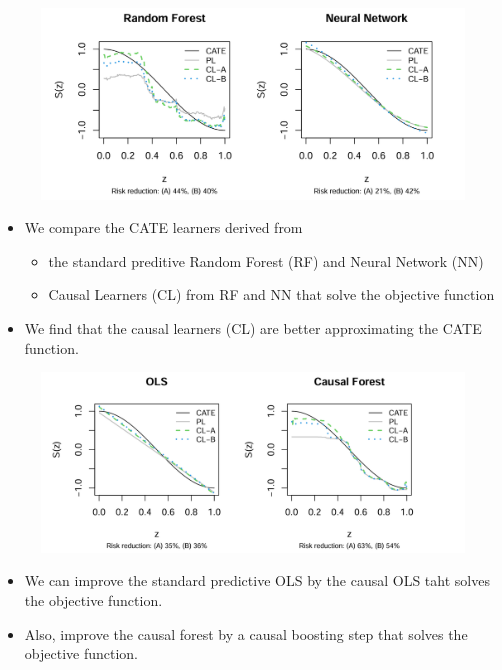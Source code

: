\documentclass[xcolor=svgnames,aspectratio=169]{beamer}
\begin{document}
\begin{frame}
    \begin{figure}
        \includegraphics[width=1.5\textwidth, height=0.6\textheight, keepaspectratio]{PLvsCL(RF,NN).png}
    \end{figure}
    \begin{itemize}
        \item We compare the CATE learners derived from 
        \begin{itemize}
            \item the standard preditive Random Forest (RF) and Neural Network (NN)
            \item Causal Learners (CL) from RF and NN that solve the objective function
        \end{itemize}
        \item We find that the causal learners (CL) are better approximating the CATE function.
    \end{itemize}
\end{frame}

\begin{frame}
    \begin{figure}
        \includegraphics[width=1.5\textwidth, height=0.6\textheight, keepaspectratio]{PLvsCL(OLS,CF).png}
    \end{figure}
    \begin{itemize}
        \item We can improve the standard predictive OLS by the causal OLS taht solves the objective function.
        \item Also, improve the causal forest by a causal boosting step that solves the objective function.
    \end{itemize}
\end{frame}
\end{document}
